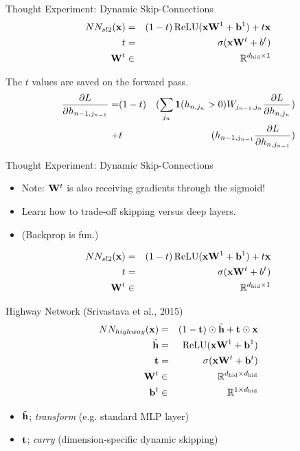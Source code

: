 \documentclass{beamer}
\begin{document}
\begin{frame}{Thought Experiment: Dynamic Skip-Connections}
  \begin{eqnarray*}
    NN_{sl2}(\boldx) &=& (1-t) \relu(\boldx \boldW^1 + \boldb^1) + t \boldx \\
    t &=& \sigma(\boldx \boldW^t + b^t) \\
    \boldW^t &\in& \reals^{\dhid \times 1} 
  \end{eqnarray*}


  The $t$ values are saved on the forward pass.
  \begin{eqnarray*}
     \frac{\partial L}{\partial h_{n-1,j_{n-1}} }  =  &(1-t)& (\sum_{j_n}   \mathbf{1}(h_{n, j_n} > 0) W_{j_{n-1},j_n} \frac{\partial L}{\partial h_{n, j_n}}) \\
    + &t& ( h_{n-1, j_{n-1}} \frac{\partial L}{\partial h_{n, j_{n-1}}})  \\ 
  \end{eqnarray*}
\end{frame}


\begin{frame}{Thought Experiment: Dynamic Skip-Connections}
  \begin{itemize}
  \item Note: $\mathbf{W}^t$ is also receiving gradients through the sigmoid!
    \air
  \item Learn how to trade-off skipping versus deep layers.
    \air
  \item (Backprop is fun.)
  \end{itemize}
  \begin{eqnarray*}
    NN_{sl2}(\boldx) &=& (1-t) \relu(\boldx \boldW^1 + \boldb^1) + t \boldx \\
    t &=& \sigma(\boldx \boldW^t + b^t) \\
    \boldW^t &\in& \reals^{\dhid \times 1} 
  \end{eqnarray*}
\end{frame}

\begin{frame}{Highway Network (Srivastava et al., 2015)}
  \begin{eqnarray*}
    NN_{highway}(\boldx) &=& (1-\boldt) \odot \tilde{\boldh} + \boldt \odot \boldx \\
    \tilde{\boldh} &=& \relu(\boldx \boldW^1 + \boldb^1) \\
    \boldt &=& \sigma(\boldx \boldW^t + \boldb^t) \\
    \boldW^t &\in& \reals^{\dhid \times \dhid} \\
    \boldb^t &\in& \reals^{1 \times \dhid} \\
  \end{eqnarray*}
  \begin{itemize}
  \item $\tilde{\mathbf{h}}$; \textit{transform} (e.g. standard MLP layer)
  \item $\mathbf{t}$; \textit{carry} (dimension-specific dynamic skipping)
  \end{itemize}
\end{frame}
\end{document}
